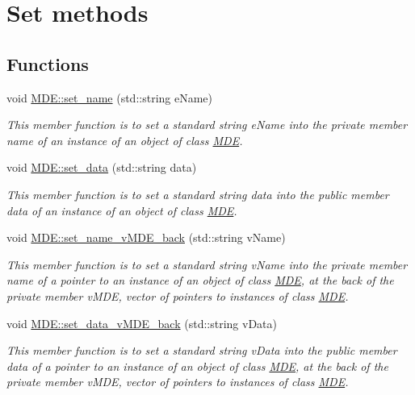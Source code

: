 \hypertarget{group__group__set}{}\section{Set methods}
\label{group__group__set}
\subsection*{Functions}
\begin{DoxyCompactItemize}
\item 
void \hyperlink{group__group__set_ga2e3674813acead6fca16b15df8b28545}{M\+D\+E\+::set\+\_\+name} (std\+::string e\+Name)
\begin{DoxyCompactList}\small\item\em This member function is to set a standard string e\+Name into the private member \textquotesingle{}name\textquotesingle{} of an instance of an object of class \hyperlink{classMDE}{M\+DE}. \end{DoxyCompactList}\item 
void \hyperlink{group__group__set_gab89912ac9a4073a53e81c45221de5cc7}{M\+D\+E\+::set\+\_\+data} (std\+::string data)
\begin{DoxyCompactList}\small\item\em This member function is to set a standard string data into the public member \textquotesingle{}data\textquotesingle{} of an instance of an object of class \hyperlink{classMDE}{M\+DE}. \end{DoxyCompactList}\item 
void \hyperlink{group__group__set_ga743b5e8fa651eaaf096211d4178a8b33}{M\+D\+E\+::set\+\_\+name\+\_\+v\+M\+D\+E\+\_\+back} (std\+::string v\+Name)
\begin{DoxyCompactList}\small\item\em This member function is to set a standard string v\+Name into the private member \textquotesingle{}name\textquotesingle{} of a pointer to an instance of an object of class \hyperlink{classMDE}{M\+DE}, at the back of the private member v\+M\+DE, vector of pointers to instances of class \hyperlink{classMDE}{M\+DE}. \end{DoxyCompactList}\item 
void \hyperlink{group__group__set_ga659df2c75204727d4f9d83b19f1499ac}{M\+D\+E\+::set\+\_\+data\+\_\+v\+M\+D\+E\+\_\+back} (std\+::string v\+Data)
\begin{DoxyCompactList}\small\item\em This member function is to set a standard string v\+Data into the public member \textquotesingle{}data\textquotesingle{} of a pointer to an instance of an object of class \hyperlink{classMDE}{M\+DE}, at the back of the private member v\+M\+DE, vector of pointers to instances of class \hyperlink{classMDE}{M\+DE}. \end{DoxyCompactList}\item 

\end{DoxyCompactItemize}
